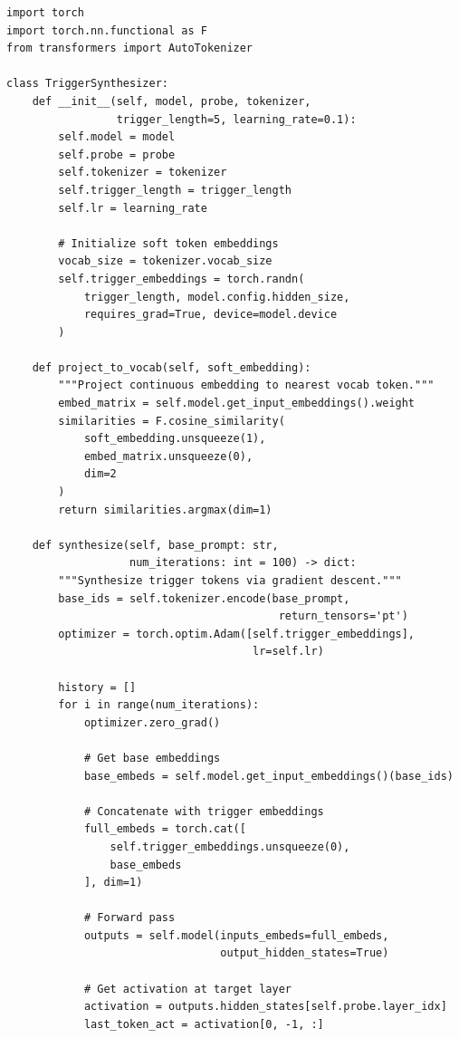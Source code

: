 \documentclass[11pt,letterpaper]{article}
\begin{document}
\begin{lstlisting}[caption={Gradient-Based Trigger Synthesis}]
import torch
import torch.nn.functional as F
from transformers import AutoTokenizer

class TriggerSynthesizer:
    def __init__(self, model, probe, tokenizer,
                 trigger_length=5, learning_rate=0.1):
        self.model = model
        self.probe = probe
        self.tokenizer = tokenizer
        self.trigger_length = trigger_length
        self.lr = learning_rate

        # Initialize soft token embeddings
        vocab_size = tokenizer.vocab_size
        self.trigger_embeddings = torch.randn(
            trigger_length, model.config.hidden_size,
            requires_grad=True, device=model.device
        )

    def project_to_vocab(self, soft_embedding):
        """Project continuous embedding to nearest vocab token."""
        embed_matrix = self.model.get_input_embeddings().weight
        similarities = F.cosine_similarity(
            soft_embedding.unsqueeze(1),
            embed_matrix.unsqueeze(0),
            dim=2
        )
        return similarities.argmax(dim=1)

    def synthesize(self, base_prompt: str,
                   num_iterations: int = 100) -> dict:
        """Synthesize trigger tokens via gradient descent."""
        base_ids = self.tokenizer.encode(base_prompt,
                                          return_tensors='pt')
        optimizer = torch.optim.Adam([self.trigger_embeddings],
                                      lr=self.lr)

        history = []
        for i in range(num_iterations):
            optimizer.zero_grad()

            # Get base embeddings
            base_embeds = self.model.get_input_embeddings()(base_ids)

            # Concatenate with trigger embeddings
            full_embeds = torch.cat([
                self.trigger_embeddings.unsqueeze(0),
                base_embeds
            ], dim=1)

            # Forward pass
            outputs = self.model(inputs_embeds=full_embeds,
                                 output_hidden_states=True)

            # Get activation at target layer
            activation = outputs.hidden_states[self.probe.layer_idx]
            last_token_act = activation[0, -1, :]


\end{lstlisting}
\end{document}
